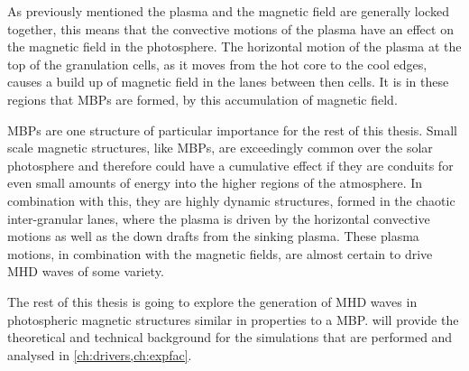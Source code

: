As previously mentioned the plasma and the magnetic field are generally locked together, this means that the convective motions of the plasma have an effect on the magnetic field in the photosphere.
The horizontal motion of the plasma at the top of the granulation cells, as it moves from the hot core to the cool edges, causes a build up of magnetic field in the lanes between then cells.
It is in these regions that MBPs are formed, by this accumulation of magnetic field.

MBPs are one structure of particular importance for the rest of this thesis.
Small scale magnetic structures, like MBPs, are exceedingly common over the solar photosphere and therefore could have a cumulative effect if they are conduits for even small amounts of energy into the higher regions of the atmosphere.
In combination with this, they are highly dynamic structures, formed in the chaotic inter-granular lanes, where the plasma is driven by the horizontal convective motions as well as the down drafts from the sinking plasma.
These plasma motions, in combination with the magnetic fields, are almost certain to drive MHD waves of some variety. 

The rest of this thesis is going to explore the generation of MHD waves in photospheric magnetic structures similar in properties to a MBP.
 will provide the theoretical and technical background for the simulations that are performed and analysed in \cref{ch:drivers,ch:expfac}.
